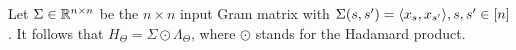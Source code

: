 \begin{lemma}\label{lm:npk}
Let $\Sigma \in \mathbb{R}^{n\times n}$ be the $n\times n $ input Gram matrix with  $\Sigma(s,s')=\langle x_s,x_{s'}\rangle,s,s'\in[n]$. It follows that $H_{\Theta}= \Sigma\odot\Lambda_{\Theta}$, where $\odot$ stands for the Hadamard product. 
\end{lemma}

